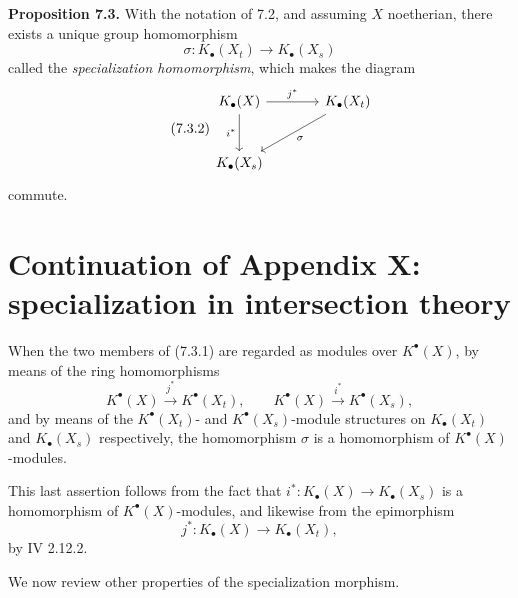 \documentclass[11pt]{article}
\newcommand{\Spec}{\operatorname{Spec}}
\begin{document}
\textbf{Proposition 7.3.} With the notation of 7.2, and assuming \(X\) noetherian, there exists a unique group homomorphism
\begin{equation}\tag{7.3.1}
 \sigma:K_\bullet(X_t)\longrightarrow K_\bullet(X_s)
\end{equation}
called the \emph{specialization homomorphism}, which makes the diagram
\begin{equation}\tag{7.3.2}
\begin{tikzcd}[column sep=large,row sep=large]
K_\bullet(X) \arrow[r,"j^*"] \arrow[d,"i^*"'] & K_\bullet(X_t) \arrow[dl,"\sigma"]\\
K_\bullet(X_s) &
\end{tikzcd}
\end{equation}
commute.



\providecommand{\Kalg}{K_{\mathrm{alg}}}
\providecommand{\Gralg}{\operatorname{Gr}_{\mathrm{alg}}}
\providecommand{\Grnum}{\operatorname{Gr}_{\mathrm{num}}}
\providecommand{\Knum}{K_{\mathrm{num}}}
\providecommand{\Cl}{\operatorname{Cl}}
\providecommand{\Ch}{\operatorname{Ch}}
\providecommand{\Nm}{\operatorname{N}}
\providecommand{\colim}{\varinjlim}
\providecommand{\Hens}{\operatorname{Hens}}
\providecommand{\red}{\mathrm{red}}
\providecommand{\Spec}{\operatorname{Spec}}
\providecommand{\coker}{\operatorname{coker}}


\section*{Continuation of Appendix X: specialization in intersection theory}

When the two members of (7.3.1) are regarded as modules over \(K^\bullet(X)\), by means of the ring homomorphisms
\[
  K^\bullet(X)\xrightarrow{j^*}K^\bullet(X_t),\qquad
  K^\bullet(X)\xrightarrow{i^*}K^\bullet(X_s),
\]
and by means of the \(K^\bullet(X_t)\)- and \(K^\bullet(X_s)\)-module structures on \(K_\bullet(X_t)\) and \(K_\bullet(X_s)\) respectively, the homomorphism \(\sigma\) is a homomorphism of \(K^\bullet(X)\)-modules.

This last assertion follows from the fact that \(i^*:K_\bullet(X)\to K_\bullet(X_s)\) is a homomorphism of \(K^\bullet(X)\)-modules, and likewise from the epimorphism
\[
  j^*:K_\bullet(X)\longrightarrow K_\bullet(X_t),
\]
by IV 2.12.2.

We now review other properties of the specialization morphism.
\end{document}
